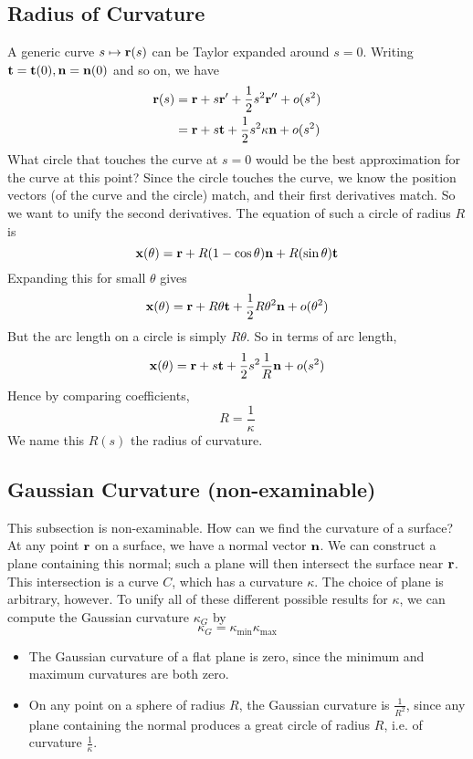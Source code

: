 \documentclass{article}
\begin{document}
\subsection{Radius of Curvature}
A generic curve $s \mapsto \vb r(s)$ can be Taylor expanded around $s=0$. Writing $\vb t = \vb t(0), \vb n = \vb n(0)$ and so on, we have
\begin{align*}
    \vb r(s) & = \vb r + s\vb r' + \frac{1}{2}s^2 \vb r'' + o(s^2)    \\
             & = \vb r + s\vb t + \frac{1}{2}s^2 \kappa\vb n + o(s^2)
\end{align*}
What circle that touches the curve at $s=0$ would be the best approximation for the curve at this point? Since the circle touches the curve, we know the position vectors (of the curve and the circle) match, and their first derivatives match. So we want to unify the second derivatives. The equation of such a circle of radius $R$ is
\[ \vb x(\theta) = \vb r + R(1 - \cos \theta)\vb n + R(\sin \theta) \vb t \]
Expanding this for small $\theta$ gives
\[ \vb x(\theta) = \vb r + R\theta\vb t + \frac{1}{2} R\theta^2\vb n + o(\theta^2) \]
But the arc length on a circle is simply $R\theta$. So in terms of arc length,
\[ \vb x(\theta) = \vb r + s\vb t + \frac{1}{2} s^2 \frac{1}{R}\vb n + o(s^2) \]
Hence by comparing coefficients,
\[ R = \frac{1}{\kappa} \]
We name this $R(s)$ the radius of curvature.

\subsection{Gaussian Curvature (non-examinable)}
This subsection is non-examinable. How can we find the curvature of a surface? At any point $\vb r$ on a surface, we have a normal vector $\vb n$. We can construct a plane containing this normal; such a plane will then intersect the surface near $\vb r$. This intersection is a curve $C$, which has a curvature $\kappa$. The choice of plane is arbitrary, however. To unify all of these different possible results for $\kappa$, we can compute the Gaussian curvature $\kappa_G$ by
\[ \kappa_G = \kappa_{\text{min}} \kappa_{\text{max}} \]
\begin{itemize}
    \item The Gaussian curvature of a flat plane is zero, since the minimum and maximum curvatures are both zero.
    \item On any point on a sphere of radius $R$, the Gaussian curvature is $\frac{1}{R^2}$, since any plane containing the normal produces a great circle of radius $R$, i.e. of curvature $\frac{1}{\kappa}$.
\end{itemize}
\end{document}
